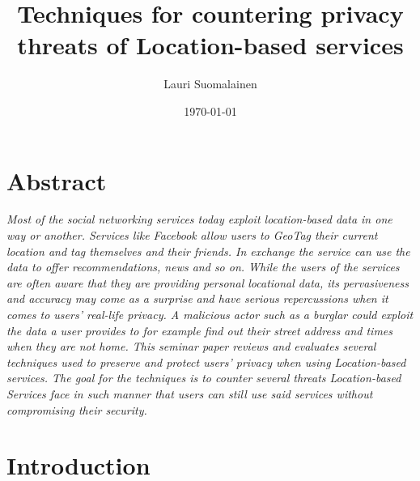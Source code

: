 \documentclass[english]{tktltiki2}
\title{Techniques for countering privacy threats of Location-based services}
\author{Lauri Suomalainen}
\date{\today}
\theoremstyle{definition}
\theoremstyle{remark}
\begin{document}

\frontmatter      %

\maketitle        %
\makeabstract     %

\tableofcontents  %
\listoffigures

\mainmatter 
\onehalfspacing

\section*{Abstract}
 \textit{Most of the social networking services today exploit location-based data in one way or another. Services like Facebook allow users to GeoTag their current location and tag themselves and their friends. In exchange the service can use the data to offer recommendations, news and so on.  While the users of the services are often aware that they are providing personal locational data, its pervasiveness and accuracy may come as a surprise and have serious repercussions when it comes to users' real-life privacy. A malicious actor such as a burglar could exploit the data a user provides to for example find out their street address and times when they are not home.
This seminar paper reviews and evaluates several techniques used to preserve and protect users' privacy when using Location-based services. The goal for the techniques is to counter several threats Location-based Services face in such manner that users can still use said services without compromising their security.}

\section{Introduction}
\end{document}
